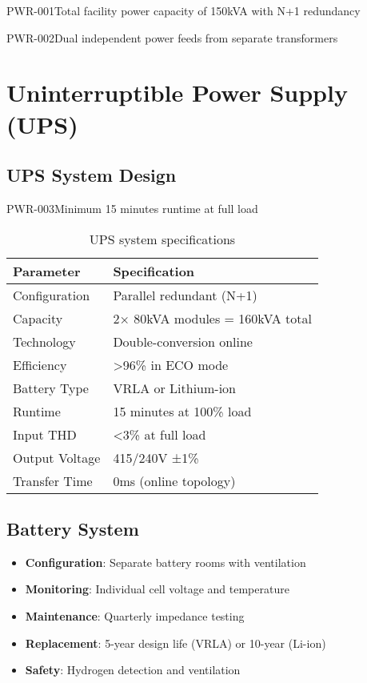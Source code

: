 \begin{requirement}{PWR-001}{Total facility power capacity of 150kVA with N+1 redundancy}
\begin{requirement}{PWR-002}{Dual independent power feeds from separate transformers}
\section{Uninterruptible Power Supply (UPS)}

\subsection{UPS System Design}

\begin{requirement}{PWR-003}{Minimum 15 minutes runtime at full load}

\begin{table}[H]
\centering
\begin{tabularx}{\textwidth}{@{}lX@{}}
\toprule
\textbf{Parameter} & \textbf{Specification} \\
\midrule
Configuration & Parallel redundant (N+1) \\
Capacity & 2× 80kVA modules = 160kVA total \\
Technology & Double-conversion online \\
Efficiency & >96\% in ECO mode \\
Battery Type & VRLA or Lithium-ion \\
Runtime & 15 minutes at 100\% load \\
Input THD & <3\% at full load \\
Output Voltage & 415/240V ±1\% \\
Transfer Time & 0ms (online topology) \\
\bottomrule
\end{tabularx}
\caption{UPS system specifications}
\end{table}

\subsection{Battery System}

\begin{itemize}
    \item \textbf{Configuration}: Separate battery rooms with ventilation
    \item \textbf{Monitoring}: Individual cell voltage and temperature
    \item \textbf{Maintenance}: Quarterly impedance testing
    \item \textbf{Replacement}: 5-year design life (VRLA) or 10-year (Li-ion)
    \item \textbf{Safety}: Hydrogen detection and ventilation
\end{itemize}


\end{requirement}
\end{requirement}
\end{requirement}
